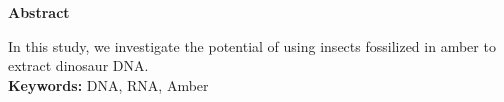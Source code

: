 \begin{center}
\textbf{\Large{Abstract}}
\end{center}
\vspace{0.7cm}
\par

In this study, we investigate the potential of using insects fossilized in amber to extract dinosaur DNA.
\\

\noindent
\textbf{Keywords: } DNA, RNA, Amber

